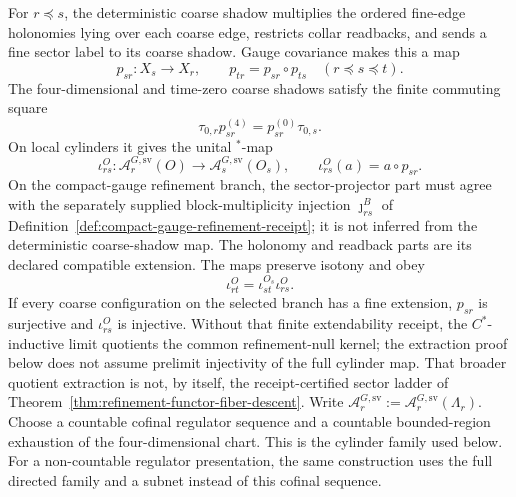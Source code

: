 \begin{definition}
For \(r\preceq s\), the deterministic coarse shadow multiplies the ordered fine-edge
holonomies lying over each coarse edge, restricts collar readbacks, and sends a fine sector label
to its coarse shadow. Gauge covariance makes this a map
\[
p_{sr}:X_s\longrightarrow X_r,
\qquad
p_{tr}=p_{sr}\circ p_{ts}\quad(r\preceq s\preceq t).
\]
The four-dimensional and time-zero coarse shadows satisfy the finite commuting square
\[
\tau_{0,r}p_{sr}^{(4)}=p_{sr}^{(0)}\tau_{0,s}.
\]
On local cylinders it gives the unital \(^*\)-map
\[
\iota_{rs}^{O}:\mathcal A_r^{G,\mathrm{sv}}(O)\longrightarrow
\mathcal A_s^{G,\mathrm{sv}}(O_s),
\qquad
\iota_{rs}^{O}(a)=a\circ p_{sr}.
\]
On the compact-gauge refinement branch, the sector-projector part must agree with the separately
supplied block-multiplicity injection \(\jmath_{rs}^{B}\) of
Definition~\ref{def:compact-gauge-refinement-receipt}; it is not inferred from the deterministic
coarse-shadow map. The holonomy and readback parts are its declared compatible extension. The maps
preserve isotony and obey
\[
\iota_{rt}^{O}=\iota_{st}^{O_s}\iota_{rs}^{O}.
\]
If every coarse configuration on the selected branch has a fine extension, \(p_{sr}\) is
surjective and \(\iota_{rs}^{O}\) is injective. Without that finite extendability receipt, the
\(C^*\)-inductive limit quotients the common refinement-null kernel; the extraction proof below
does not assume prelimit injectivity of the full cylinder map. That broader quotient extraction is
not, by itself, the receipt-certified sector ladder of
Theorem~\ref{thm:refinement-functor-fiber-descent}.
Write \(\mathcal A_r^{G,\mathrm{sv}}:=
\mathcal A_r^{G,\mathrm{sv}}(\Lambda_r)\).
Choose a countable cofinal regulator sequence and a countable bounded-region exhaustion of the
four-dimensional chart. This is the cylinder family used below. For a non-countable regulator
presentation, the same construction uses the full directed family and a subnet instead of this
cofinal sequence.
\end{definition}

